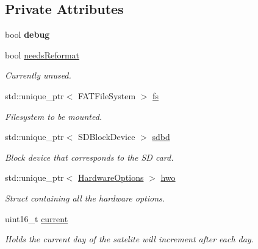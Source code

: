 \subsection*{Private Attributes}
\begin{DoxyCompactItemize}
\item 
\mbox{\label{class_sat_file_handler_adf32ed5ceacb6338730bace392c7707c}} 
bool {\bfseries debug}
\item 
bool \mbox{\hyperlink{class_sat_file_handler_a871dee72893c3b9452a1f181b33103df}{needs\+Reformat}}
\begin{DoxyCompactList}\small\item\em Currently unused. \end{DoxyCompactList}\item 
\mbox{\label{class_sat_file_handler_a911ab736da22eed7a1afdd5344c6c305}} 
std\+::unique\+\_\+ptr$<$ F\+A\+T\+File\+System $>$ \mbox{\hyperlink{class_sat_file_handler_a911ab736da22eed7a1afdd5344c6c305}{fs}}
\begin{DoxyCompactList}\small\item\em Filesystem to be mounted. \end{DoxyCompactList}\item 
\mbox{\label{class_sat_file_handler_a02b8703f737315438b2e7d2c35819eb7}} 
std\+::unique\+\_\+ptr$<$ S\+D\+Block\+Device $>$ \mbox{\hyperlink{class_sat_file_handler_a02b8703f737315438b2e7d2c35819eb7}{sdbd}}
\begin{DoxyCompactList}\small\item\em Block device that corresponds to the SD card. \end{DoxyCompactList}\item 
std\+::unique\+\_\+ptr$<$ \mbox{\hyperlink{struct_sat_file_handler_1_1_hardware_options}{Hardware\+Options}} $>$ \mbox{\hyperlink{class_sat_file_handler_a26220c492649c0424010e21de171259e}{hwo}}
\begin{DoxyCompactList}\small\item\em Struct containing all the hardware options. \end{DoxyCompactList}\item 
uint16\+\_\+t \mbox{\hyperlink{class_sat_file_handler_ac61d216e89063d7c2a62071a6d89ad34}{current}}
\begin{DoxyCompactList}\small\item\em Holds the current day of the satelite will increment after each day. \end{DoxyCompactList}\item 

\end{DoxyCompactItemize}
